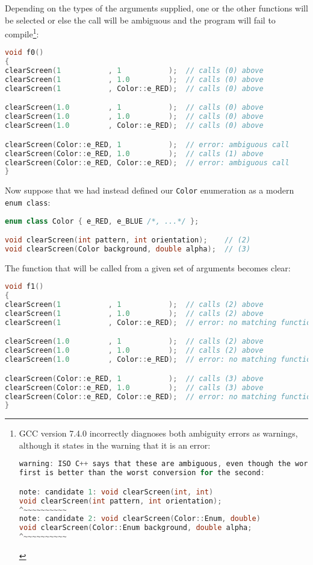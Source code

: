 \noindent Depending on the types of the arguments supplied, one or the other
functions will be selected or else the call will be ambiguous and the
program will fail to compile{\cprotect\footnote{GCC version 7.4.0
incorrectly diagnoses both ambiguity errors as warnings, although it
states in the warning that it is an error:

\begin{lstlisting}[language=C++, basicstyle={\ttfamily\footnotesize}]
warning: ISO C++ says that these are ambiguous, even though the worst conversion for the
first is better than the worst conversion for the second:

note: candidate 1: void clearScreen(int, int)
void clearScreen(int pattern, int orientation);
^~~~~~~~~~~
note: candidate 2: void clearScreen(Color::Enum, double)
void clearScreen(Color::Enum background, double alpha;
^~~~~~~~~~~
\end{lstlisting}
}}:

\begin{lstlisting}[language=C++]
void f0()
{
clearScreen(1           , 1           );  // calls (0) above
clearScreen(1           , 1.0         );  // calls (0) above
clearScreen(1           , Color::e_RED);  // calls (0) above

clearScreen(1.0         , 1           );  // calls (0) above
clearScreen(1.0         , 1.0         );  // calls (0) above
clearScreen(1.0         , Color::e_RED);  // calls (0) above

clearScreen(Color::e_RED, 1           );  // error: ambiguous call
clearScreen(Color::e_RED, 1.0         );  // calls (1) above
clearScreen(Color::e_RED, Color::e_RED);  // error: ambiguous call
}
\end{lstlisting}

\noindent Now suppose that we had instead defined our \texttt{Color} enumeration
as a modern \texttt{enum}~\texttt{class}:

\begin{lstlisting}[language=C++]
enum class Color { e_RED, e_BLUE /*, ...*/ };

void clearScreen(int pattern, int orientation);    // (2)
void clearScreen(Color background, double alpha);  // (3)
\end{lstlisting}

\noindent The function that will be called from a given set of arguments becomes
clear:

\begin{lstlisting}[language=C++]
void f1()
{
clearScreen(1           , 1           );  // calls (2) above
clearScreen(1           , 1.0         );  // calls (2) above
clearScreen(1           , Color::e_RED);  // error: no matching function

clearScreen(1.0         , 1           );  // calls (2) above
clearScreen(1.0         , 1.0         );  // calls (2) above
clearScreen(1.0         , Color::e_RED);  // error: no matching function

clearScreen(Color::e_RED, 1           );  // calls (3) above
clearScreen(Color::e_RED, 1.0         );  // calls (3) above
clearScreen(Color::e_RED, Color::e_RED);  // error: no matching function
}
\end{lstlisting}

